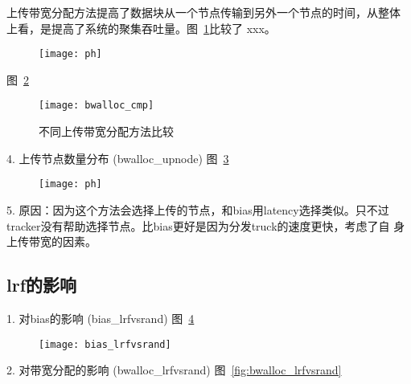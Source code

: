 上传带宽分配方法提高了数据块从一个节点传输到另外一个节点的时间，从整体
上看，是提高了系统的聚集吞吐量。图~\ref{fig:bwalloc_throughput}比较了
xxx。

\begin{figure}
  \centering
  \begin{minipage}{0.8\linewidth}
    \centering
    \texttt{[image: ph]}
    \caption{}
    \label{fig:bwalloc_throughput}
  \end{minipage}
\end{figure}


图~\ref{fig:bwalloc_cmp}

\begin{figure}
  \centering
  \begin{minipage}{0.8\linewidth}
    \centering
    \texttt{[image: bwalloc\_cmp]}
    \caption{不同上传带宽分配方法比较}
    \label{fig:bwalloc_cmp}
  \end{minipage}
\end{figure}

4. 上传节点数量分布 (bwalloc\_upnode)
图~\ref{fig:bwalloc_upnode}

\begin{figure}
  \centering
  \begin{minipage}{0.8\linewidth}
    \centering
    \texttt{[image: ph]}
    \caption{}
    \label{fig:bwalloc_upnode}
  \end{minipage}
\end{figure}

5. 原因：因为这个方法会选择上传的节点，和bias用latency选择类似。只不过
tracker没有帮助选择节点。比bias更好是因为分发truck的速度更快，考虑了自
身上传带宽的因素。

\subsection{lrf的影响}
1. 对bias的影响 (bias\_lrfvsrand)
图~\ref{fig:bias_lrfvsrand}

\begin{figure}
  \centering
  \begin{minipage}{0.8\linewidth}
    \centering
    \texttt{[image: bias\_lrfvsrand]}
    \caption{}
    \label{fig:bias_lrfvsrand}
  \end{minipage}
\end{figure}

2. 对带宽分配的影响 (bwalloc\_lrfvsrand)
图~\ref{fig:bwalloc_lrfvsrand}

